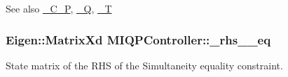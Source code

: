 \begin{DoxySeeAlso}{\-See also}
\hyperlink{classMIQPController_a17cf6f8279cf6b2ce333feb9c8fc5a5d}{\-\_\-\-C\-\_\-\-P}, \hyperlink{classMIQPController_ac6404f74d6002d6a0ca4bd2d0b41d548}{\-\_\-\-Q}, \hyperlink{classMIQPController_a1143455ae85d0e221578dbe5d659af1d}{\-\_\-\-T} 
\end{DoxySeeAlso}
\hypertarget{classMIQPController_aa8e6df5286125975521b77501e792413}{
\subsubsection[{\-\_\-rhs\-\_\-2\-\_\-eq}]{\setlength{\rightskip}{0pt plus 5cm}\-Eigen\-::\-Matrix\-Xd {\bf \-M\-I\-Q\-P\-Controller\-::\-\_\-rhs\-\_\-\_\-eq}}}\label{classMIQPController_aa8e6df5286125975521b77501e792413}
\-State matrix of the \-R\-H\-S of the \-Simultaneity equality constraint.

